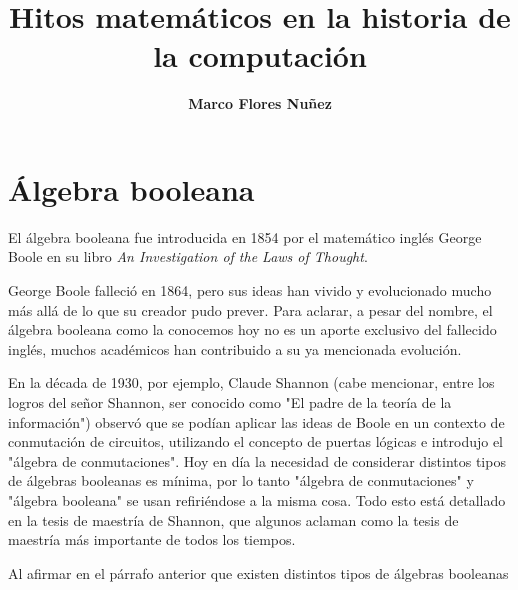 \documentclass[a4paper,10pt]{article}
\title{Hitos matemáticos en la historia de la computación}
\author{\textbf{Marco Flores Nuñez}}
\begin{document}
\maketitle

\section{Álgebra booleana}

El álgebra booleana fue introducida en 1854 por el matemático inglés George Boole en su libro \textit{An Investigation of the Laws of Thought}. 

George Boole falleció en 1864, pero sus ideas han vivido y evolucionado mucho más allá de lo que su creador pudo prever. Para aclarar, a pesar del nombre, el álgebra booleana como la conocemos hoy no es un aporte exclusivo del fallecido inglés, muchos académicos han contribuido a su ya mencionada evolución.

En la década de 1930, por ejemplo, Claude Shannon (cabe mencionar, entre los logros del señor Shannon, ser conocido como "El padre de la teoría de la información") observó que se podían aplicar las ideas de Boole en un contexto de conmutación de circuitos, utilizando el concepto de puertas lógicas e introdujo el "álgebra de conmutaciones". Hoy en día la necesidad de considerar distintos tipos de álgebras booleanas es mínima, por lo tanto "álgebra de conmutaciones" y "álgebra booleana" se usan refiriéndose a la misma cosa. Todo esto está detallado en la tesis de maestría de Shannon, que algunos aclaman como la tesis de maestría más importante de todos los tiempos.

Al afirmar en el párrafo anterior que existen distintos tipos de álgebras booleanas 
\end{document}
